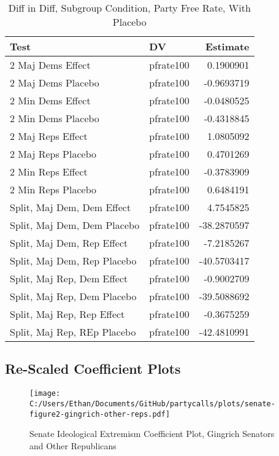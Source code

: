 \documentclass[12pt]{article}
\begin{document}
\begin{table}[H]
	\centering
	\caption{Diff in Diff, Subgroup Condition, Party Free Rate, With Placebo}
	\begin{tabular}{llr}
		\hline
		Test & DV & Estimate \\ 
		\hline
		2 Maj Dems Effect & pfrate100 & 0.1900901 \\ 
		2 Maj Dems Placebo & pfrate100 & -0.9693719 \\ 
		\hline
		2 Min Dems Effect & pfrate100 & -0.0480525 \\ 
		2 Min Dems Placebo & pfrate100 & -0.4318845 \\ 
		\hline
		2 Maj Reps Effect & pfrate100 & 1.0805092 \\ 
		2 Maj Reps Placebo & pfrate100 & 0.4701269 \\ 
		\hline
		2 Min Reps Effect & pfrate100 & -0.3783909 \\ 
		2 Min Reps Placebo & pfrate100 & 0.6484191 \\ 
		\hline
		Split, Maj Dem, Dem Effect & pfrate100 & 4.7545825 \\ 
		Split, Maj Dem, Dem Placebo & pfrate100 & -38.2870597 \\ 
		\hline
		Split, Maj Dem, Rep Effect & pfrate100 & -7.2185267 \\ 
		Split, Maj Dem, Rep Placebo & pfrate100 & -40.5703417 \\ 
		\hline
		Split, Maj Rep, Dem Effect & pfrate100 & -0.9002709 \\ 
		Split, Maj Rep, Dem Placebo & pfrate100 & -39.5088692 \\ 
		\hline
		Split, Maj Rep, Rep Effect & pfrate100 & -0.3675259 \\ 
		Split, Maj Rep, REp Placebo & pfrate100 & -42.4810991 \\ 
		\hline
	\end{tabular}
\end{table}



\subsection{Re-Scaled Coefficient Plots}

\begin{figure}[H]
	\centering
	\caption{Senate Ideological Extremism Coefficient Plot, Gingrich Senators and Other Republicans}
	\texttt{[image: C:/Users/Ethan/Documents/GitHub/partycalls/plots/senate-figure2-gingrich-other-reps.pdf]}
\end{figure}
\end{document}
